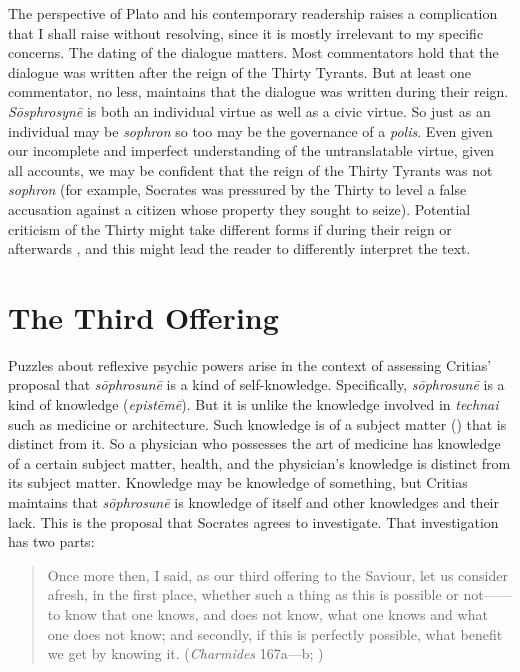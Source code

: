 The perspective of Plato and his contemporary readership raises a complication that I shall raise without resolving, since it is mostly irrelevant to my specific concerns. The dating of the dialogue matters. Most commentators hold that the dialogue was written after the reign of the Thirty Tyrants. But at least one commentator, \citet[108–9]{Schleiermarcher:1836aa} no less, maintains that the dialogue was written during their reign. \emph{Sōsphrosynē} is both an individual virtue as well as a civic virtue. So just as an individual may be \emph{sophron} so too may be the governance of a \emph{polis}. Even given our incomplete and imperfect understanding of the untranslatable virtue, given all accounts, we may be confident that the reign of the Thirty Tyrants was not \emph{sophron} (for example, Socrates was pressured by the Thirty to level a false accusation against a citizen whose property they sought to seize). Potential criticism of the Thirty might take different forms if during their reign or afterwards \citep[42]{Hyland:1981aa}, and this might lead the reader to differently interpret the text.


\section{The Third Offering} %
\label{sec:the_third_offering}

Puzzles about reflexive psychic powers arise in the context of assessing Critias' proposal that \emph{sōphrosunē} is a kind of self-knowledge. Specifically, \emph{sōphrosunē} is a kind of knowledge (\emph{epistēmē}). But it is unlike the knowledge involved in \emph{technai} such as medicine or architecture. Such knowledge is of a subject matter () that is distinct from it. So a physician who possesses the art of medicine has knowledge of a certain subject matter, health, and the physician's knowledge is distinct from its subject matter. Knowledge may be knowledge of something, but Critias maintains that \emph{sōphrosunē} is knowledge of itself and other knowledges and their lack. This is the proposal that Socrates agrees to investigate. That investigation has two parts:

\begin{quote}
	Once more then, I said, as our third offering to the Saviour, let us consider afresh, in the first place, whether such a thing as this is possible or not——to know that one knows, and does not know, what one knows and what one does not know; and secondly, if this is perfectly possible, what benefit we get by knowing it. (\emph{Charmides} 167a—b; \citealt[57]{Lamb:1927qw})
\end{quote}


